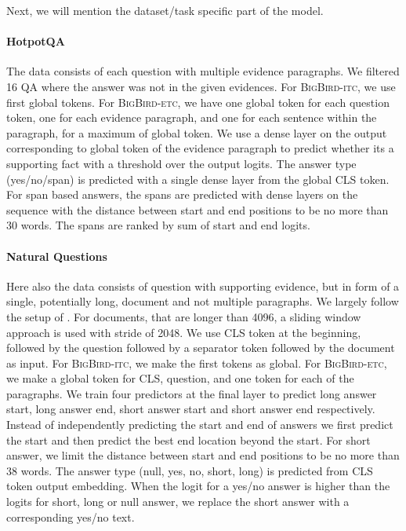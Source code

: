 \documentclass{article}
\newcommand{\bigb}{\textsc{BigBird}\xspace}
\begin{document}
Next, we will mention the dataset/task specific part of the model.

\paragraph{HotpotQA}
The data consists of each question with multiple evidence paragraphs. 
We filtered 16 QA where the answer was not in the given  evidences. 
For \bigb-\textsc{itc}, we use first  global tokens. 
For \bigb-\textsc{etc}, we have one global token for each question token, one for each evidence paragraph, and one for each sentence within the paragraph, for a maximum of  global token.
We use a dense layer on the output corresponding to global token of the evidence paragraph to predict whether its a supporting fact with a threshold over the output logits.
The answer type (yes/no/span) is predicted with a single dense layer from the global CLS token.
For span based answers, the spans are predicted with dense layers on the sequence with the distance between start and end positions to be no more than 30 words. 
The spans are ranked by sum of start and end logits.


\paragraph{Natural Questions}
Here also the data consists of question with supporting evidence, but in form of a single, potentially long, document and not multiple paragraphs. 
We largely follow the setup of \citep{alberti2019bert}.
For documents, that are longer than
4096, a sliding window approach is used
with stride of 2048.
We use CLS token at the beginning, followed by the question followed by a separator token followed by the document as input.
For \bigb-\textsc{itc}, we make the first  tokens as global. For \bigb-\textsc{etc}, we make a global token for CLS, question, and one token for each of the paragraphs.
We train four predictors at the final layer to predict long answer start, long answer end, short answer start and short answer end respectively.
Instead of independently predicting the start and end of answers we first predict the start and then predict the best end location beyond the start.
For short answer, we limit the distance between start and end positions to be no more than 38 words.
The answer type (null, yes, no, short, long) is predicted from CLS token output embedding.
When the logit for a yes/no answer is higher than the logits for short, long or null answer, we replace the short answer with a corresponding yes/no text.
\end{document}
